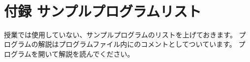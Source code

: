 \documentclass[a4paper,12pt,dvipdfmx]{jarticle}
\begin{document}
\begin{center}
\tablefirsthead{}
\tablehead{}
\tabletail{}
\tablelasttail{}
\begin{boxedminipage}{16.806cm}
	　　　　　　　　　　　　　　　　　　　　　　　　　
	\vspace{15cm}
\end{boxedminipage}
\end{center}

\bigskip

\clearpage\section{付録
サンプルプログラムリスト}
授業では使用していない、サンプルプログラムのリストを上げておきます。
プログラムの解説はプログラムファイル内にのコメントとしてついています。
プログラムを開いて解説を読んでください。
\end{document}
